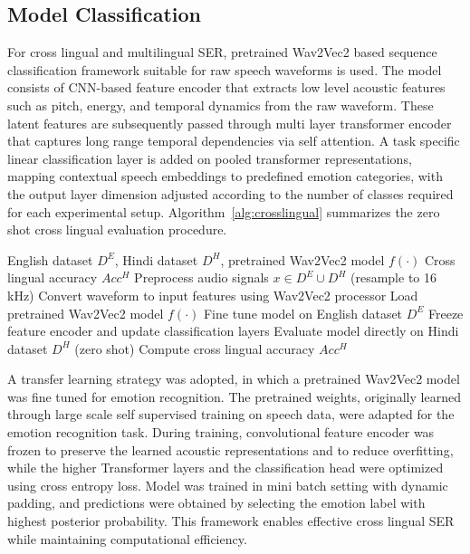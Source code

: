 \documentclass[runningheads]{llncs}
\begin{document}
\subsection{Model Classification}

For cross lingual and multilingual SER, pretrained Wav2Vec2 based sequence classification framework suitable for raw speech waveforms is used. The model consists of CNN-based feature encoder that extracts low level acoustic features such as pitch, energy, and temporal dynamics from the raw waveform. These latent features are subsequently passed through multi layer transformer encoder that captures long range temporal dependencies via self attention. A task specific linear classification layer is added on pooled transformer representations, mapping contextual speech embeddings to predefined emotion categories, with the output layer dimension adjusted according to the number of classes required for each experimental setup. Algorithm~\ref{alg:crosslingual} summarizes the zero shot cross lingual evaluation procedure.

\begin{algorithm}[htbp]
\caption{Cross lingual SER using Wav2Vec2}
\label{alg:crosslingual}
\begin{algorithmic}[1]
\Require English dataset $D^E$, Hindi dataset $D^H$, pretrained Wav2Vec2 model $f(\cdot)$
\Ensure Cross lingual accuracy $Acc^H$
\State Preprocess audio signals $x \in D^E \cup D^H$ (resample to 16\,kHz)
\State Convert waveform to input features using Wav2Vec2 processor
\State Load pretrained Wav2Vec2 model $f(\cdot)$
\State Fine tune model on English dataset $D^E$
\State Freeze feature encoder and update classification layers
\State Evaluate model directly on Hindi dataset $D^H$ (zero shot)
\State Compute cross lingual accuracy $Acc^H$
\end{algorithmic}
\end{algorithm}

A transfer learning strategy was adopted, in which a pretrained Wav2Vec2 model was fine tuned for emotion recognition. The pretrained weights, originally learned through large scale self supervised training on speech data, were adapted for the emotion recognition task. During training, convolutional feature encoder was frozen to preserve the learned acoustic representations and to reduce overfitting, while the higher Transformer layers and the classification head were optimized using cross entropy loss. Model was trained in mini batch setting with dynamic padding, and predictions were obtained by selecting the emotion label with highest posterior probability. This framework enables effective cross lingual SER while maintaining computational efficiency.
\end{document}
